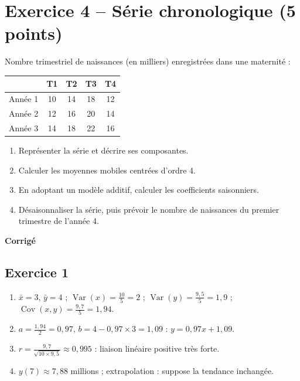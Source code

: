 \documentclass[11pt,a4paper]{article}
\begin{document}
\section*{Exercice 4 -- Série chronologique (5 points)}
Nombre trimestriel de naissances (en milliers) enregistrées dans une maternité :
\begin{center}
\begin{tabular}{lcccc}
\toprule
 & T1 & T2 & T3 & T4\\ \midrule
Année 1 & 10 & 14 & 18 & 12\\
Année 2 & 12 & 16 & 20 & 14\\
Année 3 & 14 & 18 & 22 & 16\\ \bottomrule
\end{tabular}
\end{center}
\begin{enumerate}
  \item Représenter la série et décrire ses composantes.
  \item Calculer les moyennes mobiles centrées d'ordre 4.
  \item En adoptant un modèle additif, calculer les coefficients saisonniers.
  \item Désaisonnaliser la série, puis prévoir le nombre de naissances du premier trimestre de l'année 4.
\end{enumerate}

\newpage
\begin{center}{\Large\bfseries Corrigé}\end{center}

\subsection*{Exercice 1}
\begin{enumerate}
  \item $\bar{x} = 3$, $\bar{y} = 4$ ; $\operatorname{Var}(x) = \frac{10}{5} = 2$ ; $\operatorname{Var}(y) = \frac{9{,}5}{5} = 1{,}9$ ;
  $\operatorname{Cov}(x,y) = \frac{9{,}7}{5} = 1{,}94$.
  \item $a = \frac{1{,}94}{2} = 0{,}97$, $b = 4 - 0{,}97\times3 = 1{,}09$ : $y = 0{,}97x + 1{,}09$.
  \item $r = \frac{9{,}7}{\sqrt{10\times9{,}5}} \approx 0{,}995$ : liaison linéaire positive très forte.
  \item $y(7) \approx 7{,}88$ millions ; extrapolation : suppose la tendance inchangée.
\end{enumerate}
\end{document}
